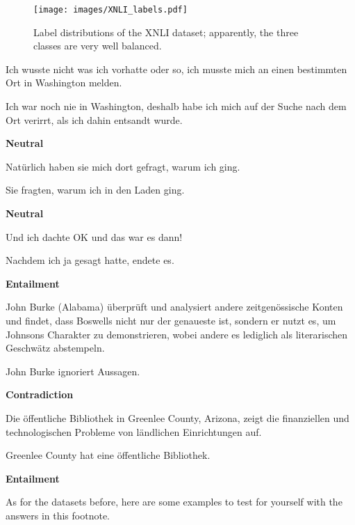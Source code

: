 \begin{wrapfigure}[20]{r}{0.45\linewidth}
  \begin{center}
    \texttt{[image: images/XNLI\_labels.pdf]}
  \end{center}
  \caption[XNLI labels]{Label distributions of the XNLI dataset; apparently, the three classes are very well balanced.}
\end{wrapfigure}

\begin{examples}
  \label{ex:xnli}
  \item Ich wusste nicht was ich vorhatte oder so, ich musste mich an einen bestimmten Ort in Washington melden.

        Ich war noch nie in Washington, deshalb habe ich mich auf der Suche nach dem Ort verirrt, als ich dahin entsandt wurde.

        \textbf{Neutral}
  \item Natürlich haben sie mich dort gefragt, warum ich ging.

        Sie fragten, warum ich in den Laden ging.

        \textbf{Neutral}
  \item Und ich dachte OK und das war es dann!

        Nachdem ich ja gesagt hatte, endete es.

        \textbf{Entailment}
  \item John Burke (Alabama) überprüft und analysiert andere zeitgenössische Konten und findet, dass Boswells nicht nur der genaueste ist, sondern er nutzt es, um Johnsons Charakter zu demonstrieren, wobei andere es lediglich als literarischen Geschwätz abstempeln.

        John Burke ignoriert Aussagen.

        \textbf{Contradiction}
  \item Die öffentliche Bibliothek in Greenlee County, Arizona, zeigt die finanziellen und technologischen Probleme von ländlichen Einrichtungen auf.

        Greenlee County hat eine öffentliche Bibliothek.

        \textbf{Entailment}
\end{examples}

As for the datasets before, here are some examples to test for yourself with the answers in
this footnote.

